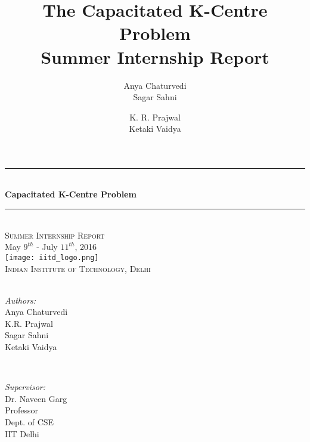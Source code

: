 \documentclass[12pt,a4paper,onecolumn]{article}
\author{Anya Chaturvedi \\ Sagar Sahni \and K. R. Prajwal \\ Ketaki Vaidya  }
\title{%
  The Capacitated K-Centre Problem\\
  \large Summer Internship Report 
  }
\date{}
\begin{document}
\begin{titlepage}

\newcommand{\HRule}{\rule{\linewidth}{0.5mm}} 

\center 




\HRule \\[0.4cm]
{ \huge \bfseries Capacitated K-Centre Problem}\\[0.4cm] %
\HRule \\[1cm]
 \textsc{\Large Summer Internship Report}\\[1cm] %
{\large May $9^{th}$ - July $11^{th}$, 2016}\\[0.5cm]

\texttt{[image: iitd\_logo.png]}\\[0.5cm] %
\textsc{\large Indian Institute of Technology, Delhi}\\[9cm] 





 \begin{minipage}{0.4\textwidth}
\begin{flushleft} \large
\emph{\\Authors:}\\
Anya Chaturvedi\\
K.R. Prajwal\\
Sagar Sahni\\
Ketaki Vaidya
\end{flushleft}
\end{minipage}
~
\begin{minipage}{0.4\textwidth}
\begin{flushright} \large
\emph{Supervisor:} \\
Dr. Naveen Garg \\
Professor\\
Dept. of CSE\\
IIT Delhi %
\end{flushright}
\end{minipage}\\[2cm]


\end{titlepage}
\end{document}
